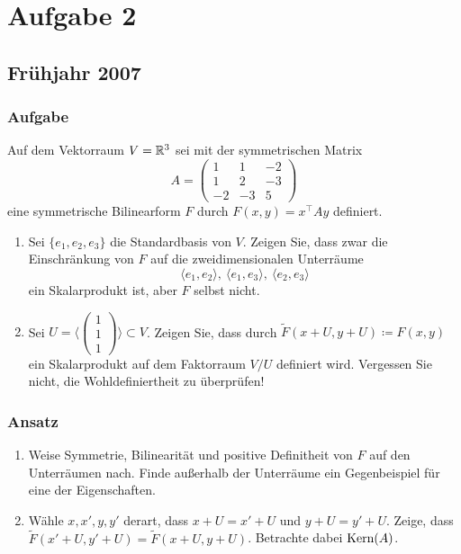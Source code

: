 \chapter{Aufgabe 2}

\section{Frühjahr 2007}

\subsection{Aufgabe}
Auf dem Vektorraum \( V = \mathbb{R}^3 \) sei mit der symmetrischen Matrix
\begin{equation*}
	A = \begin{pmatrix}
		1 & 1 & -2 \\
		1 & 2 & -3 \\
		-2 & -3 & 5
	\end{pmatrix}
\end{equation*}
eine symmetrische Bilinearform \( F \) durch \( F(x,y) = x^\top Ay \) definiert.
\begin{enumerate}
	\item Sei \( \{ e_1, e_2, e_3 \} \) die Standardbasis von \( V \). Zeigen Sie, dass zwar die Einschränkung von \( F \) auf die zweidimensionalen Unterräume
		\begin{equation*}
		 	\langle e_1, e_2 \rangle, \ \langle e_1, e_3 \rangle, \ \langle e_2, e_3 \rangle
		 \end{equation*}
		 ein Skalarprodukt ist, aber \( F \) selbst nicht.
	\item Sei \( U = \langle \left( \begin{smallmatrix}
		1 \\ 1 \\ 1
	\end{smallmatrix} \right) \rangle \subset V \). Zeigen Sie, dass durch \( \widetilde{F}(x+U,y+U) \coloneqq F(x,y) \) ein Skalarprodukt auf dem Faktorraum \( V/U \) definiert wird. Vergessen Sie nicht, die Wohldefiniertheit zu überprüfen!
\end{enumerate}

\subsection{Ansatz}
\begin{enumerate}
	\item Weise Symmetrie, Bilinearität und positive Definitheit von \( F \) auf den Unterräumen nach. Finde außerhalb der Unterräume ein Gegenbeispiel für eine der Eigenschaften.
	\item Wähle \( x,x',y,y' \) derart, dass \( x+U = x'+U \) und \( y + U = y' + U \). Zeige, dass \( \widetilde{F}(x'+U, y' + U) = \widetilde{F}(x+U,y+U) \). Betrachte dabei \( \text{Kern}(A) \).
\end{enumerate}

